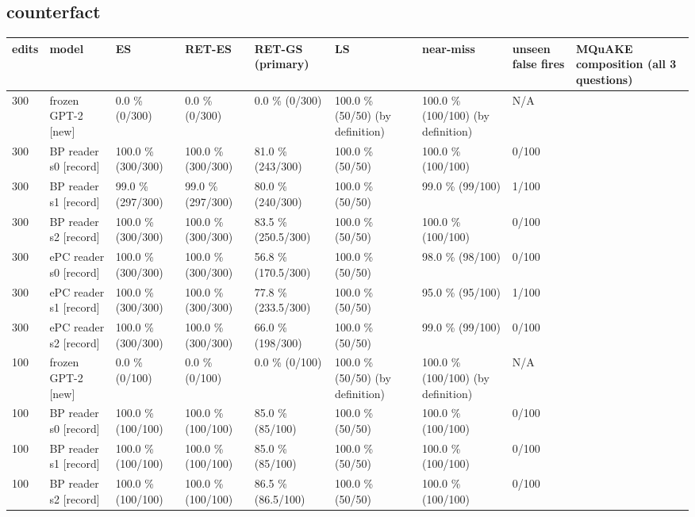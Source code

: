 \documentclass[10pt,a4paper]{article}
\begin{document}
\subsection*{counterfact}



\begin{center}\scriptsize
\begin{tabularx}{\textwidth}{@{}p{}XXXXXXXX@{}}
\toprule
edits & model & ES & RET-ES & RET-GS (primary) & LS & near-miss & unseen false fires & MQuAKE composition (all 3 questions) \\ \midrule
300 & frozen GPT-2 [new] & 0.0 \% (0/300) & 0.0 \% (0/300) & 0.0 \% (0/300) & 100.0 \% (50/50) (by definition) & 100.0 \% (100/100) (by definition) & N/A &  \\
300 & BP reader s0 [record] & 100.0 \% (300/300) & 100.0 \% (300/300) & 81.0 \% (243/300) & 100.0 \% (50/50) & 100.0 \% (100/100) & 0/100 &  \\
300 & BP reader s1 [record] & 99.0 \% (297/300) & 99.0 \% (297/300) & 80.0 \% (240/300) & 100.0 \% (50/50) & 99.0 \% (99/100) & 1/100 &  \\
300 & BP reader s2 [record] & 100.0 \% (300/300) & 100.0 \% (300/300) & 83.5 \% (250.5/300) & 100.0 \% (50/50) & 100.0 \% (100/100) & 0/100 &  \\
300 & ePC reader s0 [record] & 100.0 \% (300/300) & 100.0 \% (300/300) & 56.8 \% (170.5/300) & 100.0 \% (50/50) & 98.0 \% (98/100) & 0/100 &  \\
300 & ePC reader s1 [record] & 100.0 \% (300/300) & 100.0 \% (300/300) & 77.8 \% (233.5/300) & 100.0 \% (50/50) & 95.0 \% (95/100) & 1/100 &  \\
300 & ePC reader s2 [record] & 100.0 \% (300/300) & 100.0 \% (300/300) & 66.0 \% (198/300) & 100.0 \% (50/50) & 99.0 \% (99/100) & 0/100 &  \\
100 & frozen GPT-2 [new] & 0.0 \% (0/100) & 0.0 \% (0/100) & 0.0 \% (0/100) & 100.0 \% (50/50) (by definition) & 100.0 \% (100/100) (by definition) & N/A &  \\
100 & BP reader s0 [record] & 100.0 \% (100/100) & 100.0 \% (100/100) & 85.0 \% (85/100) & 100.0 \% (50/50) & 100.0 \% (100/100) & 0/100 &  \\
100 & BP reader s1 [record] & 100.0 \% (100/100) & 100.0 \% (100/100) & 85.0 \% (85/100) & 100.0 \% (50/50) & 100.0 \% (100/100) & 0/100 &  \\
100 & BP reader s2 [record] & 100.0 \% (100/100) & 100.0 \% (100/100) & 86.5 \% (86.5/100) & 100.0 \% (50/50) & 100.0 \% (100/100) & 0/100 &  \\

\end{tabularx}
\end{center}
\end{document}
